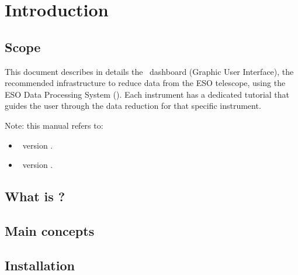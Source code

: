 \section{Introduction}

\subsection{Scope}

This document describes in details the \edpsgui\ dashboard (Graphic
User Interface), the recommended infrastructure to reduce data from
the ESO telescope, using the ESO Data Processing System
(\edps). Each instrument has a dedicated tutorial that guides the user
through the data reduction for that specific instrument.

Note: this manual refers to:
\begin{itemize}
\item \edps\ version \edpsversion.
\item \edpsgui\ version \edpsguiversion.
\end{itemize}

\subsection{What is \edps?}
\label{sec:what_is_edps}


\subsection{Main concepts}
\label{sec:main_concepts}


\subsection{Installation}
\label{sec:installation}

